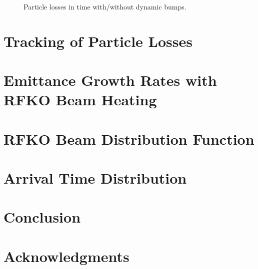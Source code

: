 \documentclass[aps,prstab,onecolumn,preprint,nofootinbib]{revtex4-1}
\begin{document}
\begin{figure}[tbh!]
  \begin{center}
    \caption{\label{fig:bump5}Particle losses in time with/without dynamic bumps.}
  \end{center}
\end{figure}

\section{\label{sec:loss}Tracking of Particle Losses}



\section{\label{sec:emit}Emittance Growth Rates with RFKO Beam Heating}

\section{\label{sec:rfko}RFKO Beam Distribution Function}

\section{\label{sec:arrival}Arrival Time Distribution}

\section{\label{sec:conclusion}Conclusion}

\section{\label{thanks}Acknowledgments}

\begin{thebibliography}{77}


\end{thebibliography}
\end{document}
